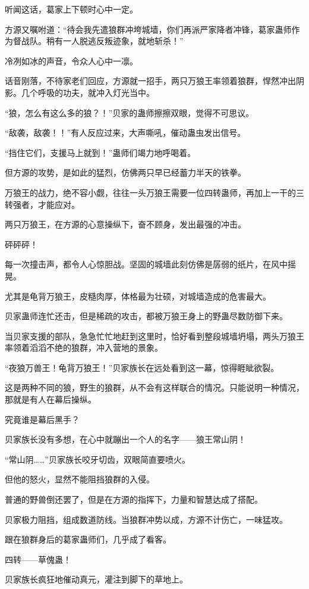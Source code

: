 \begin{this_body}
听闻这话，葛家上下顿时心中一定。

方源又嘱咐道：“待会我先遣狼群冲垮城墙，你们再派严家降者冲锋，葛家蛊师作为督战队。稍有一人脱逃反叛迹象，就地斩杀！”

冷冽如冰的声音，令众人心中一凛。

话音刚落，不待家老们回应，方源就一招手，两只万狼王率领着狼群，悍然冲出阴影。几个呼吸的功夫，就冲入灯光当中。

“狼，怎么有这么多的狼？！”贝家的蛊师擦擦双眼，觉得不可思议。

“敌袭，敌袭！！”有人反应过来，大声嘶吼，催动蛊虫发出信号。

“挡住它们，支援马上就到！”蛊师们竭力地呼喝着。

但方源的攻势，是如此的猛烈，仿佛两只早已经蓄力半天的铁拳。

万狼王的战力，绝不容小觑，往往一头万狼王需要一位四转蛊师，再加上一干的三转强者，才能应对。

两只万狼王，在方源的心意操纵下，奋不顾身，发出最强的冲击。

砰砰砰！

每一次撞击声，都令人心惊胆战。坚固的城墙此刻仿佛是孱弱的纸片，在风中摇晃。

尤其是龟背万狼王，皮糙肉厚，体格最为壮硕，对城墙造成的危害最大。

贝家蛊师连忙还击，但是稀疏的攻击，都被万狼王身上的野蛊尽数防御下来。

当贝家支援的部队，急急忙忙地赶到这里时，恰好看到整段城墙坍塌，两头万狼王率领着滔滔不绝的狼群，冲入营地的景象。

“夜狼万兽王！龟背万狼王！”贝家族长在远处看到这一幕，惊得睚眦欲裂。

这是两种不同的狼，野生的狼群，从不会有这样联合的情况。只能说明一种情况，那就是有人在幕后操纵。

究竟谁是幕后黑手？

贝家族长没有多想，在心中就蹦出一个人的名字——狼王常山阴！

“常山阴……”贝家族长咬牙切齿，双眼简直要喷火。

但他的怒火，显然不能阻挡狼群的入侵。

普通的野兽倒还罢了，但是在方源的指挥下，力量和智慧达成了搭配。

贝家极力阻挡，组成数道防线。当狼群冲势以成，方源不计伤亡，一味猛攻。

跟在狼群身后的葛家蛊师们，几乎成了看客。

四转——草傀蛊！

贝家族长疯狂地催动真元，灌注到脚下的草地上。


\end{this_body}
